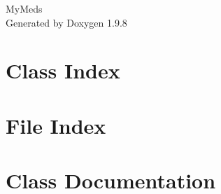 \documentclass[twoside]{book}
\newcommand{\+}{\discretionary{\mbox{\scriptsize$\hookleftarrow$}}{}{}}
\newcommand{\clearemptydoublepage}{%
    \newpage{\pagestyle{empty}\cleardoublepage}%
  }
\begin{document}
  \raggedbottom
    \hypersetup{pageanchor=false,
                bookmarksnumbered=true,
                pdfencoding=unicode
               }
  \begin{titlepage}
  \vspace*{7cm}
  \begin{center}%
  {\Large My\+Meds}\\
  \vspace*{1cm}
  {\large Generated by Doxygen 1.9.8}\\
  \end{center}
  \end{titlepage}
  \clearemptydoublepage
  \tableofcontents
  \clearemptydoublepage
  \hypersetup{pageanchor=true}
\chapter{Class Index}

\chapter{File Index}

\chapter{Class Documentation}






\end{document}
